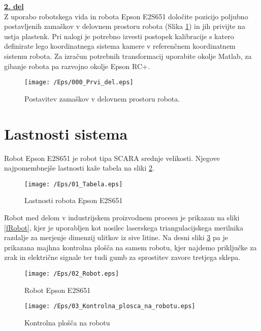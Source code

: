 \underline{\textbf{2. del}} \\%

Z uporabo robotskega vida in robota Epson E2S651 določite pozicijo
poljubno postavljenih zamaškov v delovnem prostoru robota (Slika
\ref{fScara_Del2}) in jih privijte na ustja plastenk. Pri nalogi je
potrebno izvesti postopek kalibracije s katero definirate lego
koordinatnega sistema kamere v referenčnem koordinatnem sistemu
robota. Za izračun potrebnih transformacij uporabite okolje Matlab,
za gibanje robota pa razvojno okolje Epson RC+.

\begin{figure}[h]
    \centering
    \texttt{[image: /Eps/000\_Prvi\_del.eps]}
    \vspace{-0.3cm}
    \caption{Postavitev zamaškov v delovnem prostoru robota.}
    \label{fScara_Del2}
\end{figure}

\section{Lastnosti sistema}

Robot Epson E2S651 je robot tipa SCARA srednje velikosti. Njegove
najpomembnejše lastnosti kaže tabela na sliki \ref{fTabela}.

\begin{figure}[h]
    \centering
    \texttt{[image: /Eps/01\_Tabela.eps]}
    \vspace{-0.3cm}
    \caption{Lastnosti robota Epson E2S651}
    \label{fTabela}
\end{figure}

Robot med delom v industrijskem proizvodnem procesu je prikazan na
sliki \ref{fRobot}, kjer je uporabljen kot nosilec laserskega
triangulacijskega merilnika razdalje za merjenje dimenzij ulitkov iz
sive litine. Na desni sliki \ref{fKontrolna_plosca} pa je prikazana
majhna kontrolna plošča na samem robotu, kjer najdemo priključke za
zrak in električne signale ter tudi gumb za sprostitev zavore
tretjega sklepa.


\begin{figure}[t]
    \centering
    \begin{minipage}{.4\textwidth}
        \centering
        \texttt{[image: /Eps/02\_Robot.eps]}
        \vspace{-0.0cm}
        \caption{Robot Epson E2S651}
        \label{fRobot}
    \end{minipage}
    \begin{minipage}{.55\textwidth}
        \centering
        \texttt{[image: /Eps/03\_Kontrolna\_plosca\_na\_robotu.eps]}
        \caption{Kontrolna plošča na robotu}
        \label{fKontrolna_plosca}
    \end{minipage}
\end{figure}



